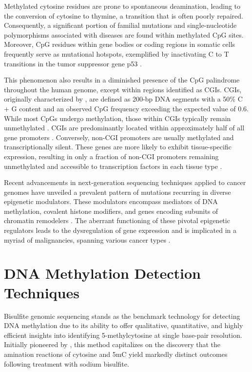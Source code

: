 Methylated cytosine residues are prone to spontaneous deamination, leading to the conversion of cytosine to thymine, a transition that is often poorly repaired. Consequently, a significant portion of familial mutations and single-nucleotide polymorphisms associated with diseases are found within methylated \ac{CpG} sites. Moreover, \ac{CpG} residues within gene bodies or coding regions in somatic cells frequently serve as mutational hotspots, exemplified by inactivating C to T transitions in the tumor suppressor gene p53 \citep{meth_p53}.

This phenomenon also results in a diminished presence of the \ac{CpG} palindrome throughout the human genome, except within regions identified as \acp{CGI}. \acp{CGI}, originally characterized by \cite{cgi}, are defined as 200-bp DNA segments with a 50\% C + G content and an observed \ac{CpG} frequency exceeding the expected value of 0.6. While most \acp{CpG} undergo methylation, those within \acp{CGI} typically remain unmethylated \citep{cgi2}. \acp{CGI} are predominantly located within approximately half of all gene promoters \citep{cgi3}. Conversely, non-\ac{CGI} promoters are usually methylated and transcriptionally silent. These genes are more likely to exhibit tissue-specific expression, resulting in only a fraction of non-\ac{CGI} promoters remaining unmethylated and accessible to transcription factors in each tissue type \citep{meth_chrom}.

Recent advancements in next-generation sequencing techniques applied to cancer genomes have unveiled a prevalent pattern of mutations recurring in diverse epigenetic modulators. These modulators encompass mediators of DNA methylation, covalent histone modifiers, and genes encoding subunits of chromatin remodelers \citep{meth_cancer}. The aberrant functioning of these pivotal epigenetic regulators leads to the dysregulation of gene expression and is implicated in a myriad of malignancies, spanning various cancer types \citep{meth_cancer2}.

\section{DNA Methylation Detection Techniques}

Bisulfite genomic sequencing stands as the benchmark technology for detecting DNA methylation due to its ability to offer qualitative, quantitative, and highly efficient insights into identifying 5-methylcytosine at single base-pair resolution. Initially pioneered by \cite{bisulfite_ori}, this method capitalizes on the discovery that the amination reactions of cytosine and \ac{5mC} yield markedly distinct outcomes following treatment with sodium bisulfite.

